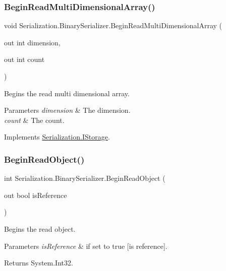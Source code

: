 \subsubsection{\texorpdfstring{Begin\+Read\+Multi\+Dimensional\+Array()}{BeginReadMultiDimensionalArray()}}
{\footnotesize\ttfamily void Serialization.\+Binary\+Serializer.\+Begin\+Read\+Multi\+Dimensional\+Array (\begin{DoxyParamCaption}\item[{out int}]{dimension,  }\item[{out int}]{count }\end{DoxyParamCaption})\hspace{0.3cm}{\ttfamily [inline]}}



Begins the read multi dimensional array. 


\begin{DoxyParams}{Parameters}
{\em dimension} & The dimension.\\
\hline
{\em count} & The count.\\
\hline
\end{DoxyParams}


Implements \hyperlink{interface_serialization_1_1_i_storage_a27e63deec5c78fd5013d1d3b7607e04c}{Serialization.\+I\+Storage}.

\mbox{\label{class_serialization_1_1_binary_serializer_a44117e9f1e92e01af20f98cbd674f638}} 
\subsubsection{\texorpdfstring{Begin\+Read\+Object()}{BeginReadObject()}}
{\footnotesize\ttfamily int Serialization.\+Binary\+Serializer.\+Begin\+Read\+Object (\begin{DoxyParamCaption}\item[{out bool}]{is\+Reference }\end{DoxyParamCaption})\hspace{0.3cm}{\ttfamily [inline]}}



Begins the read object. 


\begin{DoxyParams}{Parameters}
{\em is\+Reference} & if set to {\ttfamily true} \mbox{[}is reference\mbox{]}.\\
\hline
\end{DoxyParams}
\begin{DoxyReturn}{Returns}
System.\+Int32.
\end{DoxyReturn}


